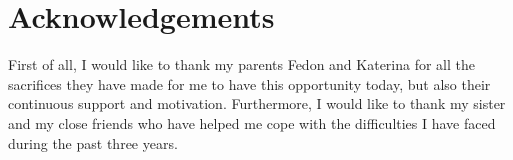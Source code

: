 
\chapter*{Acknowledgements}

First of all, I would like to thank my parents Fedon and Katerina for all the sacrifices they have made for
me to have this opportunity today, but also their continuous support and motivation. Furthermore, I would
like to thank my sister and my close friends who have helped me cope with the difficulties I have faced during the past
three years.
